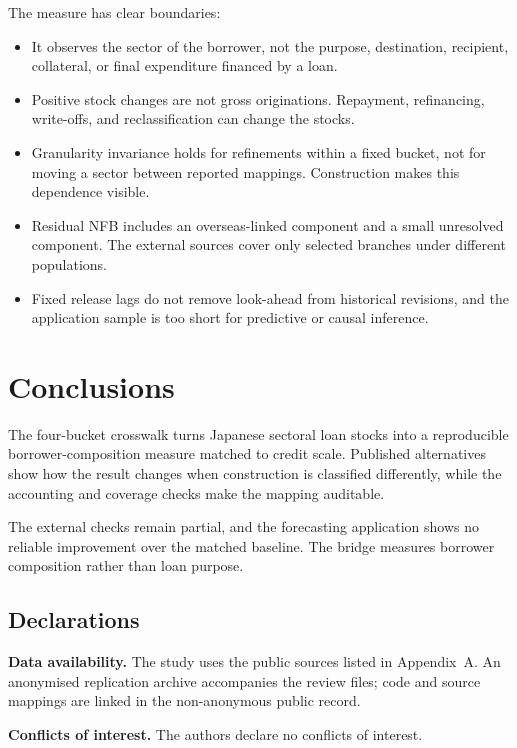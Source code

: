 \documentclass[11pt]{article}
\begin{document}
The measure has clear boundaries:
\begin{itemize}
  \item It observes the sector of the borrower, not the purpose, destination,
        recipient, collateral, or final expenditure financed by a loan.
  \item Positive stock changes are not gross originations. Repayment,
        refinancing, write-offs, and reclassification can change the stocks.
  \item Granularity invariance holds for refinements within a fixed bucket, not
        for moving a sector between reported mappings. Construction makes
        this dependence visible.
  \item Residual NFB includes an overseas-linked component and a small
        unresolved component. The external sources cover only selected
        branches under different populations.
  \item Fixed release lags do not remove look-ahead from historical revisions,
        and the application sample is too short for predictive or causal
        inference.
\end{itemize}

\section{Conclusions}

The four-bucket crosswalk turns Japanese sectoral loan stocks into a
reproducible borrower-composition measure matched to credit scale. Published
alternatives show how the result changes when construction is classified
differently, while the accounting and coverage checks make the mapping
auditable.

The external checks remain partial, and the forecasting application shows no
reliable improvement over the matched baseline. The bridge measures borrower
composition rather than loan purpose.

\begingroup
\small
\subsection*{Declarations}

\noindent\textbf{Data availability.}
The study uses the public sources listed in Appendix~A. An anonymised
replication archive accompanies the review files; code and source mappings are
linked in the non-anonymous public record.

\medskip
\noindent\textbf{Conflicts of interest.}
The authors declare no conflicts of interest.
\end{document}
